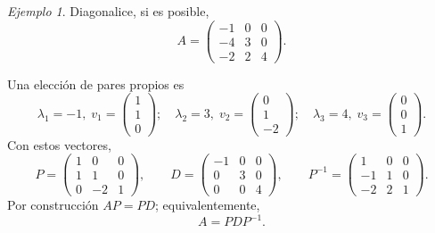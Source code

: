 \documentclass[12pt]{article}
\theoremstyle{remark}
\newtheorem{Ejem}[definicion]{Ejemplo}
\begin{document}
\begin{Ejem}


Diagonalice, si es posible,
\[
A=\begin{pmatrix}-1 & 0 & 0\\-4 & 3 & 0\\-2 & 2 & 4\end{pmatrix}.
\]

\scriptsize
Una elección de pares propios es
\[
\lambda_1=-1,\;v_1=\begin{pmatrix}1\\1\\0\end{pmatrix};\quad \lambda_2=3,\;v_2=\begin{pmatrix}0\\1\\-2\end{pmatrix};\quad \lambda_3=4,\;v_3=\begin{pmatrix}0\\0\\1\end{pmatrix}.
\]
Con estos vectores,
\[
P=\begin{pmatrix}1 & 0 & 0\\1 & 1 & 0\\0 & -2 & 1\end{pmatrix},\qquad D=\begin{pmatrix}-1 & 0 & 0\\0 & 3 & 0\\0 & 0 & 4\end{pmatrix},\qquad P^{-1}=\begin{pmatrix}1 & 0 & 0\\-1 & 1 & 0\\-2 & 2 & 1\end{pmatrix}.
\]
Por construcción $AP=PD$; equivalentemente,
\[
\boxed{A=PDP^{-1}}.
\]

\end{Ejem}
\end{document}
